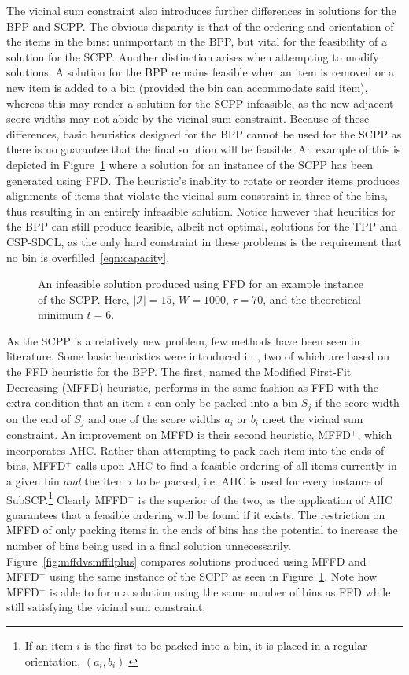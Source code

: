 \documentclass[authoryear]{elsarticle}
\begin{document}
The vicinal sum constraint also introduces further differences in solutions for the BPP and SCPP. The obvious disparity is that of the ordering and orientation of the items in the bins: unimportant in the BPP, but vital for the feasibility of a solution for the SCPP. Another distinction arises when attempting to modify solutions. A solution for the BPP remains feasible when an item is removed or a new item is added to a bin (provided the bin can accommodate said item), whereas this may render a solution for the SCPP infeasible, as the new adjacent score widths may not abide by the vicinal sum constraint. Because of these differences, basic heuristics designed for the BPP cannot be used for the SCPP as there is no guarantee that the final solution will be feasible.  An example of this is depicted in Figure~\ref{fig:ffd} where a solution for an instance of the SCPP has been generated using FFD. The heuristic's inablity to rotate or reorder items produces alignments of items that violate the vicinal sum constraint in three of the bins, thus resulting in an entirely infeasible solution. Notice however that heuritics for the BPP can still produce feasible, albeit not optimal, solutions for the TPP and CSP-SDCL, as the only hard constraint in these problems is the requirement that no bin is overfilled~\eqref{eqn:capacity}.

\begin{figure}[h]	
	\centering
	
	\caption{An infeasible solution produced using FFD for an example instance of the SCPP. Here, $|\mathcal{I}| = 15$, $W = 1000$, $\tau = 70$, and the theoretical minimum $t = 6$.}	
	\label{fig:ffd}
\end{figure}

\noindent As the SCPP is a relatively new problem, few methods have been seen in literature. Some basic heuristics were introduced in \citet{hawa2018}, two of which are based on the FFD heuristic for the BPP. The first, named the Modified First-Fit Decreasing (MFFD) heuristic, performs in the same fashion as FFD with the extra condition that an item $i$ can only be packed into a bin $S_j$ if the score width on the end of $S_j$ and one of the score widths $a_i$ or $b_i$ meet the vicinal sum constraint. An improvement on MFFD is their second heuristic, MFFD$^+$, which incorporates AHC. Rather than attempting to pack each item into the ends of bins, MFFD$^+$ calls upon AHC to find a feasible ordering of all items currently in a given bin \emph{and} the item $i$ to be packed, i.e. AHC is used for every instance of SubSCP.\footnote{If an item $i$ is the first to be packed into a bin, it is placed in a regular orientation, $(a_i, b_i)$.} Clearly MFFD$^+$ is the superior of the two, as the application of AHC guarantees that a feasible ordering will be found if it exists. The restriction on MFFD of only packing items in the ends of bins has the potential to increase the number of bins being used in a final solution unnecessarily. Figure~\ref{fig:mffdvsmffdplus} compares solutions produced using MFFD and MFFD$^+$ using the same instance of the SCPP as seen in Figure~\ref{fig:ffd}. Note how MFFD$^+$ is able to form a solution using the same number of bins as FFD while still satisfying the vicinal sum constraint.
\end{document}

